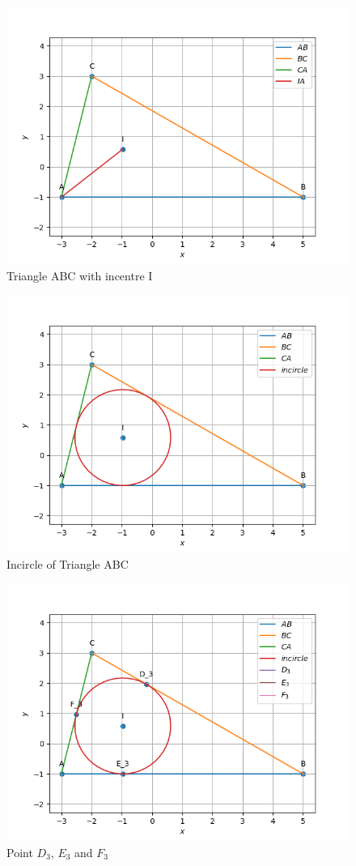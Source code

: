 \documentclass[journal,12pt,twocolumn]{IEEEtran}
\theoremstyle{remark}
\begin{document}
\begin{figure}[!ht]
              \centering
              \includegraphics[width=\columnwidth]{./figs/fig1.5.3.png}
              \caption{Triangle ABC with incentre I}
              \label{fig:18}
\end{figure}
\begin{figure}[!ht]
              \centering
              \includegraphics[width=\columnwidth]{./figs/fig1.5.7.png}
              \caption{Incircle of Triangle ABC}
              \label{fig:19}
\end{figure}
\begin{figure}[!ht]
              \centering
              \includegraphics[width=\columnwidth]{./figs/fig1.5.9.png}
              \caption{Point $D_3$, $E_3$ and $F_3$}
              \label{fig:20}
\end{figure}
\end{document}
